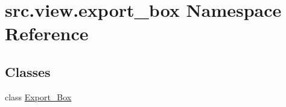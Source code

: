 \hypertarget{namespacesrc_1_1view_1_1export__box}{}\section{src.\+view.\+export\+\_\+box Namespace Reference}
\label{namespacesrc_1_1view_1_1export__box}
\subsection*{Classes}
\begin{DoxyCompactItemize}
\item 
class \hyperlink{classsrc_1_1view_1_1export__box_1_1Export__Box}{Export\+\_\+\+Box}
\end{DoxyCompactItemize}
